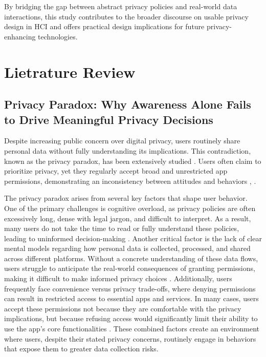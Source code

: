 \documentclass[acmlarge, nonacm]{acmart}
\begin{document}
By bridging the gap between abstract privacy policies and real-world data interactions, this study contributes to the broader discourse on usable privacy design in HCI and offers practical design implications for future privacy-enhancing technologies.

\section{Lietrature Review}

\subsection{Privacy Paradox: Why Awareness Alone Fails to Drive Meaningful Privacy Decisions}

Despite increasing public concern over digital privacy, users routinely share personal data without fully understanding its implications. This contradiction, known as the privacy paradox, has been extensively studied \cite{Gerber2018Explaining}. Users often claim to prioritize privacy, yet they regularly accept broad and unrestricted app permissions, demonstrating an inconsistency between attitudes and behaviors \cite{barth2017privacy}, \cite{baruh2017big}.

The privacy paradox arises from several key factors that shape user behavior. One of the primary challenges is cognitive overload, as privacy policies are often excessively long, dense with legal jargon, and difficult to interpret. As a result, many users do not take the time to read or fully understand these policies, leading to uninformed decision-making \cite{Obar2018The}. Another critical factor is the lack of clear mental models regarding how personal data is collected, processed, and shared across different platforms. Without a concrete understanding of these data flows, users struggle to anticipate the real-world consequences of granting permissions, making it difficult to make informed privacy choices \cite{balebako2022nudging}. Additionally, users frequently face convenience versus privacy trade-offs, where denying permissions can result in restricted access to essential apps and services. In many cases, users accept these permissions not because they are comfortable with the privacy implications, but because refusing access would significantly limit their ability to use the app’s core functionalities \cite{Fleischhauer2022Paradox}. These combined factors create an environment where users, despite their stated privacy concerns, routinely engage in behaviors that expose them to greater data collection risks.
\end{document}
